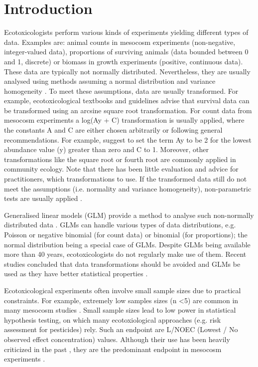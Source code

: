\documentclass[twocolumn, natbib]{svjour3}
\begin{document}
\section{Introduction}
\label{sec:intro}
Ecotoxicologists perform various kinds of experiments yielding different types of data.
Examples are: animal counts in mesocosm experiments (non-negative, integer-valued data), proportions of surviving animals (data bounded between 0 and 1, discrete) or biomass in growth experiments (positive, continuous data).
These data are typically not normally distributed. 
Nevertheless, they are usually analysed using methods assuming a normal distribution and variance homogeneity \citep{wang_making_2011}. 
To meet these assumptions, data are usually transformed.
For example, ecotoxicological textbooks \citep{newman_quantitative_2012} and guidelines \citep{epa_methods_2002,oecd_current_2006} advise that survival data can be transformed using an arcsine square root transformation. 
For count data from mesocosm experiments a log(Ay + C) transformation is usually applied, where the constants A and C are either chosen arbitrarily or following general recommendations. 
For example, \citet{van_den_brink_impact_2000} suggest to set the term Ay to be 2 for the lowest abundance value (y) greater than zero and C to 1. 
Moreover, other transformations like the square root or fourth root are commonly applied in community ecology.
Note that there has been little evaluation and advice for practitioners, which transformations to use.
If the transformed data still do not meet the assumptions (i.e. normality and variance homogeneity), non-parametric tests are usually applied \citep{wang_making_2011}.

Generalised linear models (GLM) provide a method to analyse such non-normally distributed data \citep{nelder_generalized_1972}.
GLMs can handle various types of data distributions, e.g. Poisson or negative binomial (for count data) or binomial (for proportions); the normal distribution being a special case of GLMs.
Despite GLMs being available more than 40 years, ecotoxicologists do not regularly make use of them.
Recent studies concluded that data transformations should be avoided and GLMs be used as they have better statistical properties \citep{ohara_not_2010, warton_arcsine_2011,warton_many_2005}. 

Ecotoxicological experiments often involve small sample sizes due to practical constraints. 
For example, extremely low samples sizes (n \textless 5) are common in many mesocosm studies \citep{sanderson_pesticide_2002,szocs_analysing_2015}.
Small sample sizes lead to low power in statistical hypothesis testing, on which many ecotoxiological approaches (e.g. risk assessment for pesticides) rely. 
Such an endpoint are L/NOEC (Lowest / No observed effect concentration) values.
Although their use has been heavily criticized in the past \citep{laskowski_good_1995}, they are the predominant endpoint in mesocosm experiments \citep{brock_minimum_2015, efsa_ppr_guidance_2013}. 
\end{document}

